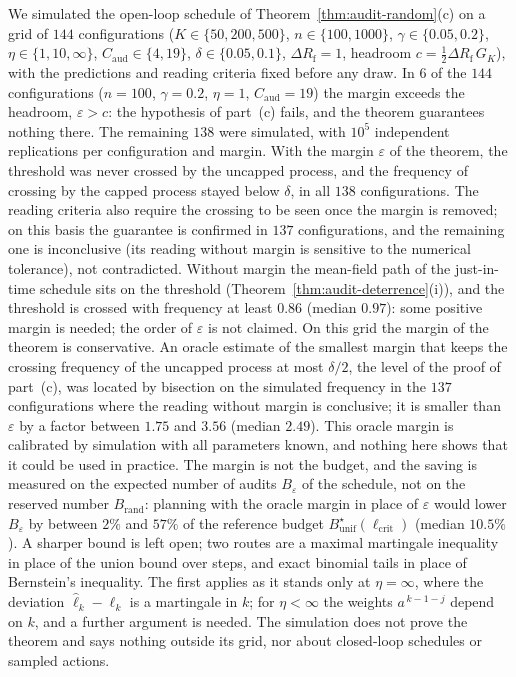 \begin{remark}\label{rem:audit-random-sim}
We simulated the open-loop schedule of Theorem~\ref{thm:audit-random}(c) on a grid of $144$ configurations ($K\in\{50,200,500\}$, $n\in\{100,1000\}$, $\gamma\in\{0.05,0.2\}$, $\eta\in\{1,10,\infty\}$, $C_{\mathrm{aud}}\in\{4,19\}$, $\delta\in\{0.05,0.1\}$, $\Delta R_{\mathrm f}=1$, headroom $c=\tfrac12\Delta R_{\mathrm f}\,G_K$), with the predictions and reading criteria fixed before any draw. In $6$ of the $144$ configurations ($n=100$, $\gamma=0.2$, $\eta=1$, $C_{\mathrm{aud}}=19$) the margin exceeds the headroom, $\varepsilon>c$: the hypothesis of part~(c) fails, and the theorem guarantees nothing there. The remaining $138$ were simulated, with $10^5$ independent replications per configuration and margin. With the margin $\varepsilon$ of the theorem, the threshold was never crossed by the uncapped process, and the frequency of crossing by the capped process stayed below $\delta$, in all $138$ configurations. The reading criteria also require the crossing to be seen once the margin is removed; on this basis the guarantee is confirmed in $137$ configurations, and the remaining one is inconclusive (its reading without margin is sensitive to the numerical tolerance), not contradicted. Without margin the mean-field path of the just-in-time schedule sits on the threshold (Theorem~\ref{thm:audit-deterrence}(i)), and the threshold is crossed with frequency at least $0.86$ (median $0.97$): some positive margin is needed; the order of $\varepsilon$ is not claimed. On this grid the margin of the theorem is conservative. An oracle estimate of the smallest margin that keeps the crossing frequency of the uncapped process at most $\delta/2$, the level of the proof of part~(c), was located by bisection on the simulated frequency in the $137$ configurations where the reading without margin is conclusive; it is smaller than $\varepsilon$ by a factor between $1.75$ and $3.56$ (median $2.49$). This oracle margin is calibrated by simulation with all parameters known, and nothing here shows that it could be used in practice. The margin is not the budget, and the saving is measured on the expected number of audits $B_\varepsilon$ of the schedule, not on the reserved number $B_{\mathrm{rand}}$: planning with the oracle margin in place of $\varepsilon$ would lower $B_\varepsilon$ by between $2\%$ and $57\%$ of the reference budget $B^\star_{\mathrm{unif}}(\ell_{\mathrm{crit}})$ (median $10.5\%$). A sharper bound is left open; two routes are a maximal martingale inequality in place of the union bound over steps, and exact binomial tails in place of Bernstein's inequality. The first applies as it stands only at $\eta=\infty$, where the deviation $\hat\ell_k-\ell_k$ is a martingale in $k$; for $\eta<\infty$ the weights $a^{\,k-1-j}$ depend on $k$, and a further argument is needed. The simulation does not prove the theorem and says nothing outside its grid, nor about closed-loop schedules or sampled actions.
\end{remark}

